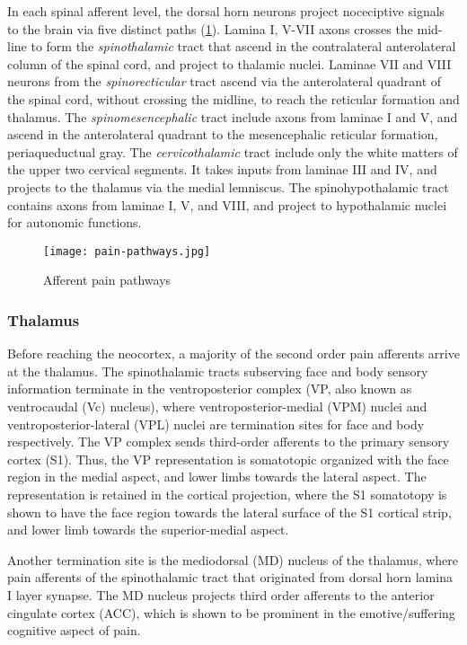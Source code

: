 In each spinal afferent level, the dorsal horn neurons project noceciptive signals to the brain via five distinct paths (\ref{fig:pain-pathways}). Lamina I, V-VII axons crosses the mid-line to form the \textit{spinothalamic} tract that ascend in the contralateral anterolateral column of the spinal cord, and project to thalamic nuclei. Laminae VII and VIII neurons from the \textit{spinorecticular} tract ascend via the anterolateral quadrant of the spinal cord, without crossing the midline, to reach the reticular formation and thalamus. The \textit{spinomesencephalic} tract include axons from laminae I and V, and ascend in the anterolateral quadrant to the mesencephalic reticular formation, periaqueductual gray. The \textit{cervicothalamic} tract include only the white matters of the upper two cervical segments. It takes inputs from laminae III and IV, and projects to the thalamus via the medial lemniscus. The spinohypothalamic tract contains axons from laminae I, V, and VIII, and project to hypothalamic nuclei for autonomic functions. 

 \begin{figure}[ht]
 \texttt{[image: pain-pathways.jpg]}
 \centering
 \caption{Afferent pain pathways} 
 \label{fig:pain-pathways}
 \end{figure}
 
 
\subsubsection{Thalamus}

Before reaching the neocortex, a majority of the second order pain afferents arrive at the thalamus. The spinothalamic tracts subserving face and body sensory information terminate in the ventroposterior complex (VP, also known as ventrocaudal (Vc) nucleus), where ventroposterior-medial (VPM) nuclei and ventroposterior-lateral (VPL) nuclei are termination sites for face and body respectively. The VP complex sends third-order afferents to the primary sensory cortex (S1). Thus, the VP representation is somatotopic organized with the face region in the medial aspect, and lower limbs towards the lateral aspect. The representation is retained in the cortical projection, where the S1 somatotopy is shown to have the face region towards the lateral surface of the S1 cortical strip, and lower limb towards the superior-medial aspect. 

Another termination site is the mediodorsal (MD) nucleus of the thalamus, where pain afferents of the spinothalamic tract that originated from dorsal horn lamina I layer synapse. The MD nucleus projects third order afferents to the anterior cingulate cortex (ACC), which is shown to be prominent in the emotive/suffering cognitive aspect of pain.  

